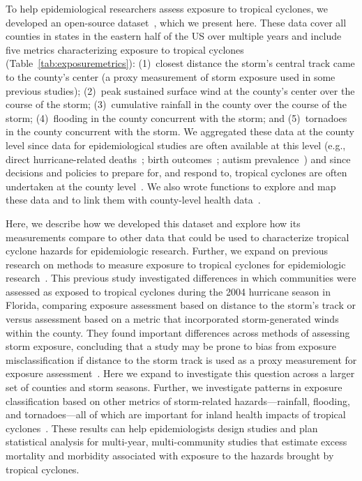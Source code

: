 To help epidemiological researchers assess exposure to tropical cyclones, we
developed an open-source dataset~\parencite{hurricaneexposure}, which we
present here.  These data cover all counties in states in the eastern half of
the \ac{US} over multiple years and include five metrics characterizing
exposure to tropical cyclones (Table~\ref{tab:exposuremetrics}): (1)~closest
distance the storm's central track came to the county's center (a proxy
measurement of storm exposure used in some previous studies); (2)~peak
sustained surface wind at the county's center over the course of the storm;
(3)~cumulative rainfall in the county over the course of the storm;
(4)~flooding in the county concurrent with the storm; and (5)~tornadoes in the
county concurrent with the storm.  We aggregated these data at the county level
since data for epidemiological studies are often available at this level (e.g.,
direct hurricane-related deaths~\parencite{czajkowski2011}; birth
outcomes~\parencite{grabich2015, grabich2015measuring}; autism
prevalence~\parencite{kinney2008}) and since decisions and policies to prepare
for, and respond to, tropical cyclones are often undertaken at the county
level~\parencite{zandbergen2009, rappaport2000}.  We also wrote functions to
explore and map these data and to link them with county-level health
data~\parencite{hurricaneexposuredata}. 

Here, we describe how we developed this dataset and explore how its
measurements compare to other data that could be used to characterize tropical
cyclone hazards for epidemiologic research. Further, we expand on previous
research on methods to measure exposure to tropical cyclones for epidemiologic
research~\parencite{grabich2015measuring}. This previous study investigated
differences in which communities were assessed as exposed to tropical cyclones
during the 2004 hurricane season in Florida, comparing exposure assessment
based on distance to the storm's track or versus assessment based on a metric
that incorporated storm-generated winds within the county.  They found
important differences across methods of assessing storm exposure, concluding
that a study may be prone to bias from exposure misclassification if distance
to the storm track is used as a proxy measurement for exposure
assessment~\parencite{grabich2015measuring}.  Here we expand to investigate
this question across a larger set of counties and storm seasons.  Further, we
investigate patterns in exposure classification based on other metrics of
storm-related hazards---rainfall, flooding, and tornadoes---all of which are
important for inland health impacts of tropical
cyclones~\parencite{czajkowski2011, moore2012}. These results can help
epidemiologists design studies and plan statistical analysis for multi-year,
multi-community studies that estimate excess mortality and morbidity associated
with exposure to the hazards brought by tropical cyclones. 
